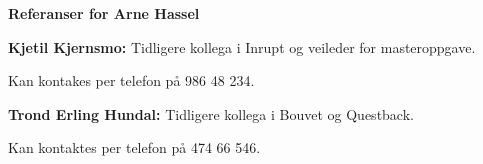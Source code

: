 \documentclass[letterpaper,11pt,norsk]{article}
\begin{document}
  \textbf{\Large Referanser for Arne Hassel}

  \textbf{Kjetil Kjernsmo:} Tidligere kollega i Inrupt og veileder for masteroppgave.

  Kan kontakes per telefon på 986 48 234.

  \textbf{Trond Erling Hundal:} Tidligere kollega i Bouvet og Questback.

  Kan kontaktes per telefon på 474 66 546.
\end{document}
